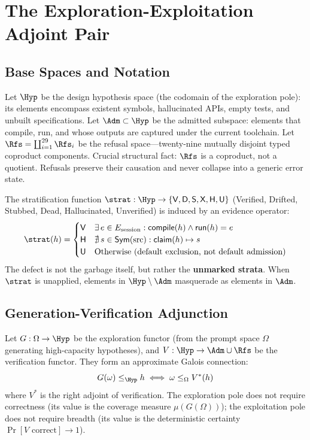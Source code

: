 \chapter{The Exploration-Exploitation Adjoint Pair}

\section{Base Spaces and Notation}

\begin{defn}
Let $\Hyp$ be the design hypothesis space (the codomain of the exploration pole): its elements encompass existent symbols, hallucinated APIs, empty tests, and unbuilt specifications. Let $\Adm \subset \Hyp$ be the admitted subspace: elements that compile, run, and whose outputs are captured under the current toolchain. Let $\Rfs = \coprod_{i=1}^{29} \Rfs_i$ be the refusal space---twenty-nine mutually disjoint typed coproduct components.
Crucial structural fact: $\Rfs$ is a coproduct, not a quotient. Refusals preserve their causation and never collapse into a generic error state.
\end{defn}

\begin{defn}
The stratification function $\strat : \Hyp \to \{\mathsf{V}, \mathsf{D}, \mathsf{S}, \mathsf{X}, \mathsf{H}, \mathsf{U}\}$ (Verified, Drifted, Stubbed, Dead, Hallucinated, Unverified) is induced by an evidence operator:
\[
\strat(h) = \begin{cases}
\mathsf{V} & \exists\, e \in E_{\text{session}} : \mathsf{compile}(h) \wedge \mathsf{run}(h) = e \\
\mathsf{H} & \nexists\, s \in \mathsf{Sym}(\text{src}) : \mathsf{claim}(h) \mapsto s \\
\mathsf{U} & \text{Otherwise (default exclusion, not default admission)}
\end{cases}
\]
The defect is not the garbage itself, but rather the \textbf{unmarked strata}. When $\strat$ is unapplied, elements in $\Hyp \setminus \Adm$ masquerade as elements in $\Adm$.
\end{defn}

\section{Generation-Verification Adjunction}

\begin{defn}
Let $G : \Omega \to \Hyp$ be the exploration functor (from the prompt space $\Omega$ generating high-capacity hypotheses), and $V : \Hyp \to \Adm \cup \Rfs$ be the verification functor. They form an approximate Galois connection:
\[
G(\omega) \le_{\Hyp} h \iff \omega \le_{\Omega} V^*(h)
\]
where $V^*$ is the right adjoint of verification. The exploration pole does not require correctness (its value is the coverage measure $\mu(G(\Omega))$); the exploitation pole does not require breadth (its value is the deterministic certainty $\Pr[V \text{ correct}] \to 1$).
\end{defn}

